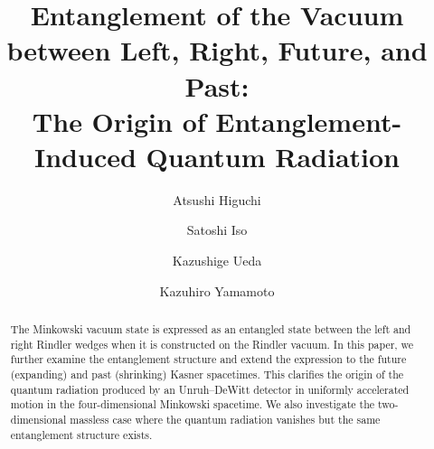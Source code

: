 \documentclass[aps,prd,preprintnumbers,nofootinbib,showpacs,11pt]{revtex4}%
\begin{document}
\providecommand{\abs}[1]{\lvert#1\rvert}
\providecommand{\bd}[1]{\boldsymbol{#1}}

\vspace{2cm}
\title{Entanglement of the Vacuum between Left, Right, Future, and Past: \\
The Origin of Entanglement-Induced Quantum Radiation}
\vspace{1cm}

\author{Atsushi Higuchi}

\author{Satoshi Iso}

\author{Kazushige Ueda}

\author{Kazuhiro Yamamoto}


\begin{abstract} 
The Minkowski vacuum state is expressed as an entangled state 
between the left and right Rindler wedges
when it is constructed on the Rindler vacuum. 
In this paper, we further examine the entanglement structure and extend the expression  
to the future (expanding) and past (shrinking) Kasner spacetimes.
This clarifies the origin of the quantum radiation produced by an Unruh--DeWitt detector 
in uniformly accelerated motion in the four-dimensional Minkowski spacetime.  
We also investigate the two-dimensional massless case where the quantum radiation vanishes
but the same entanglement structure exists.
\end{abstract} 

\maketitle

\def\I{{\rm I}}
\def\R{{\rm R}}
\def\II{{\rm II}}
\def\III{{\rm III}}
\def\IV{{\rm IV}}
\def\L{{\rm L}}
\def\F{{\rm F}}
\def\P{{\rm P}}
\def\d{{\rm d}}
\def\s{{\rm s}}
\end{document}
